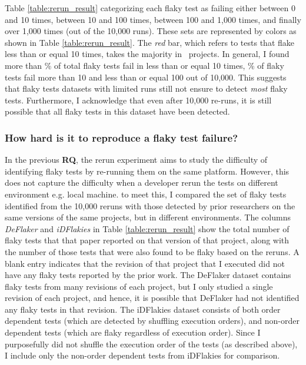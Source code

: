 Table \ref{table:rerun_result} categorizing each flaky test as failing either between 0 and 10 times, between 10 and 100 times, between 100 and 1,000 times, and finally over 1,000 times (out of the 10,000 runs).
These sets are represented by colors as shown in Table \ref{table:rerun_result}. The \emph{red} bar, which refers to tests that flake less than or equal 10 times, takes the majority in \redbarsratio~projects. 
In general, I found more than \NumFailingRunsTen\% of total flaky tests fail in less than or equal 10 times, \NumFailingRunsHundred\% of flaky tests fail more than 10 and less than or equal 100 out of 10,000.
This suggests that flaky tests datasets with limited runs still not ensure to detect \emph{most} flaky tests.
Furthermore, I acknowledge that even after 10,000 re-runs, it is still possible that all flaky tests in this dataset have been detected. 

\subsubsection{How hard is it to reproduce a flaky test failure?}
\label{FlakeFlaggerRQ2}

In the previous \textbf{RQ}, the rerun experiment aims to study the difficulty of identifying flaky tests by re-running them on the same platform. However, this does not capture the difficulty when a developer rerun the tests on different environment e.g. local machine. to meet this, I compared the set of flaky tests identified from the 10,000 reruns with those detected by prior researchers on the same versions of the same projects, but in different environments.
The columns \emph{DeFlaker} and \emph{iDFlakies} in Table \ref{table:rerun_result} show the total number of flaky tests that that paper reported on that version of that project, along with the number of those tests that were also found to be flaky based on the reruns.
A blank entry indicates that the revision of that project that I executed did not have any flaky tests reported by the prior work.
The DeFlaker dataset contains flaky tests from many revisions of each project, but I only studied a single revision of each project, and hence, it is possible that DeFlaker had not identified any flaky tests in that revision.
The iDFlakies dataset consists of both order dependent tests (which are detected by shuffling execution orders), and non-order dependent tests (which are flaky regardless of execution order).
Since I purposefully did not shuffle the execution order of the tests (as described above), I include only the non-order dependent tests from iDFlakies for comparison. 

